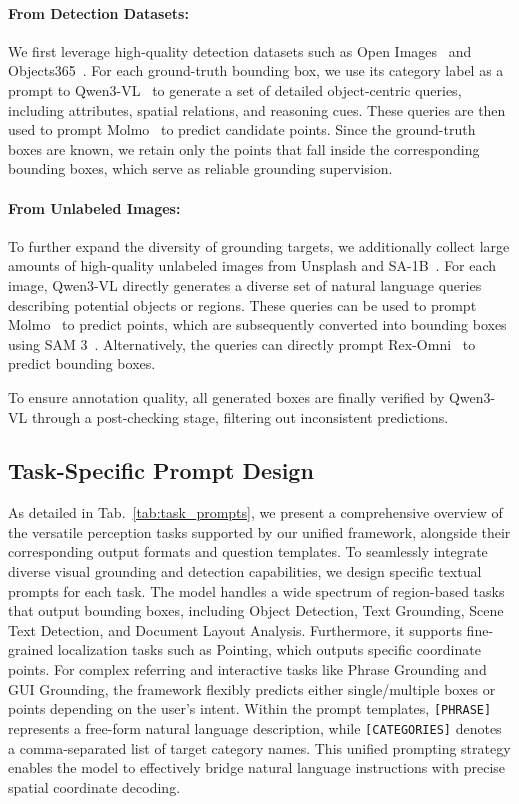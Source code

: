 \documentclass{llmxive}
\begin{document}
\paragraph{From Detection Datasets:}
We first leverage high-quality detection datasets such as Open Images~\citep{kuznetsova2020open} and Objects365~\citep{Shao_2019_ICCV}. For each ground-truth bounding box, we use its category label as a prompt to Qwen3-VL~\citep{bai2025qwen3vltechnicalreport} to generate a set of detailed object-centric queries, including attributes, spatial relations, and reasoning cues. These queries are then used to prompt Molmo~\citep{deitke2025molmo} to predict candidate points. Since the ground-truth boxes are known, we retain only the points that fall inside the corresponding bounding boxes, which serve as reliable grounding supervision.

\paragraph{From Unlabeled Images:}
To further expand the diversity of grounding targets, we additionally collect large amounts of high-quality unlabeled images from Unsplash and SA-1B~\citep{kirillov2023segment}. For each image, Qwen3-VL directly generates a diverse set of natural language queries describing potential objects or regions. These queries can be used to prompt Molmo~\citep{deitke2025molmo} to predict points, which are subsequently converted into bounding boxes using SAM 3~\citep{carion2025sam3segmentconcepts}. Alternatively, the queries can directly prompt Rex-Omni~\citep{jiang2025rexomni} to predict bounding boxes. 

To ensure annotation quality, all generated boxes are finally verified by Qwen3-VL\citep{bai2025qwen3vltechnicalreport} through a post-checking stage, filtering out inconsistent predictions.

\subsection{Task-Specific Prompt Design}

As detailed in Tab.~\ref{tab:task_prompts}, we present a comprehensive overview of the versatile perception tasks supported by our unified framework, alongside their corresponding output formats and question templates. To seamlessly integrate diverse visual grounding and detection capabilities, we design specific textual prompts for each task. The model handles a wide spectrum of region-based tasks that output bounding boxes, including Object Detection, Text Grounding, Scene Text Detection, and Document Layout Analysis. Furthermore, it supports fine-grained localization tasks such as Pointing, which outputs specific coordinate points. For complex referring and interactive tasks like Phrase Grounding and GUI Grounding, the framework flexibly predicts either single/multiple boxes or points depending on the user's intent. Within the prompt templates, \texttt{[PHRASE]} represents a free-form natural language description, while \texttt{[CATEGORIES]} denotes a comma-separated list of target category names. This unified prompting strategy enables the model to effectively bridge natural language instructions with precise spatial coordinate decoding.
\end{document}
